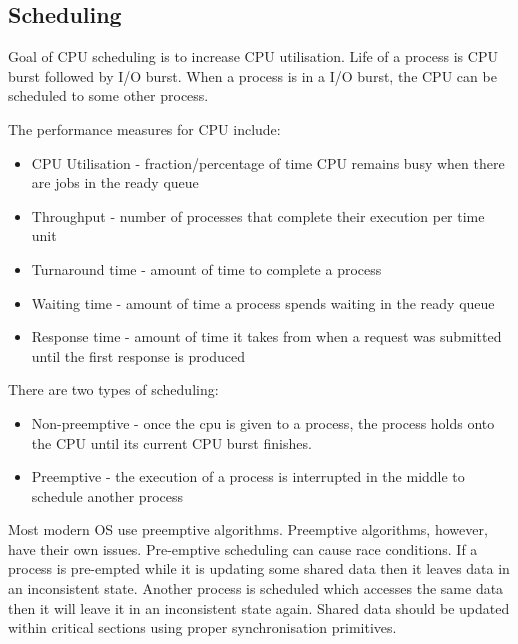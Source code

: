 \documentclass[a4paper]{article}
\theoremstyle{plain}
\theoremstyle{definition}
\newtheorem{defn}{Definition}[section]
\theoremstyle{remark}
\begin{document}
\subsection{Scheduling}
\begin{tcolorbox}[colback=black!3!white,colframe=black!60!white,title=\begin{defn}CPU and I/O bursts \label{CPU and I/O bursts}\end{defn}]
Goal of CPU scheduling is to increase CPU utilisation. Life of a process is CPU burst followed by I/O burst. When a process is in a I/O burst, the CPU can be scheduled to some other process.
\end{tcolorbox}
\begin{tcolorbox}[colback=black!3!white,colframe=black!60!white,title=\begin{defn}Performance Measures \label{Performance Measures}\end{defn}]
The performance measures for CPU include:
\begin{itemize}
	\item CPU Utilisation - fraction/percentage of time CPU remains busy when there are jobs in the ready queue
	\item Throughput - number of processes that complete their execution per time unit
	\item Turnaround time - amount of time to complete a process
	\item Waiting time - amount of time a process spends waiting in the ready queue
	\item Response time - amount of time it takes from when a request was submitted until the first response is produced
\end{itemize}
\end{tcolorbox}
\begin{tcolorbox}[colback=black!3!white,colframe=black!60!white,title=\begin{defn}Types of scheduling \label{Types of scheduling}\end{defn}]
There are two types of scheduling:
\begin{itemize}
	\item Non-preemptive - once the cpu is given to a process, the process holds onto the CPU until its current CPU burst finishes.
	\item Preemptive - the execution of a process is interrupted in the middle to schedule another process
\end{itemize}
Most modern OS use preemptive algorithms. Preemptive algorithms, however, have their own issues. Pre-emptive scheduling can cause race conditions. If a process is pre-empted while it is updating some shared data then it leaves data in an inconsistent state. Another process is scheduled which accesses the same data then it will leave it in an inconsistent state again. Shared data should be updated within critical sections using proper synchronisation primitives.
\end{tcolorbox}
\end{document}
